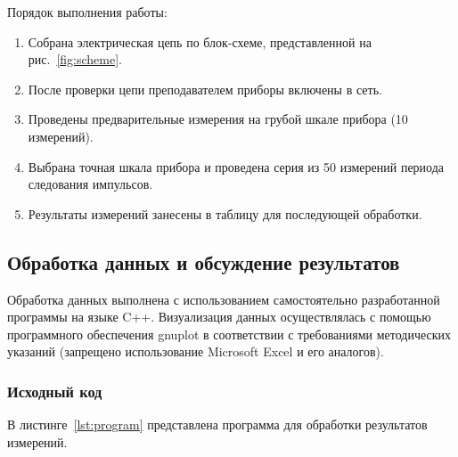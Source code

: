 Порядок выполнения работы:

\begin{enumerate}
    \item Собрана электрическая цепь по блок-схеме, представленной на рис.~\ref{fig:scheme}.
    \item После проверки цепи преподавателем приборы включены в сеть.
    \item Проведены предварительные измерения на грубой шкале прибора (10 измерений).
    \item Выбрана точная шкала прибора и проведена серия из 50 измерений периода следования импульсов.
    \item Результаты измерений занесены в таблицу для последующей обработки.
\end{enumerate}

\subsection{Обработка данных и обсуждение результатов}

Обработка данных выполнена с использованием самостоятельно разработанной программы на языке C++. Визуализация данных осуществлялась с помощью программного обеспечения gnuplot в соответствии с требованиями методических указаний (запрещено использование Microsoft Excel и его аналогов).

\subsubsection{Исходный код}

В листинге~\ref{lst:program} представлена программа для обработки результатов измерений.

